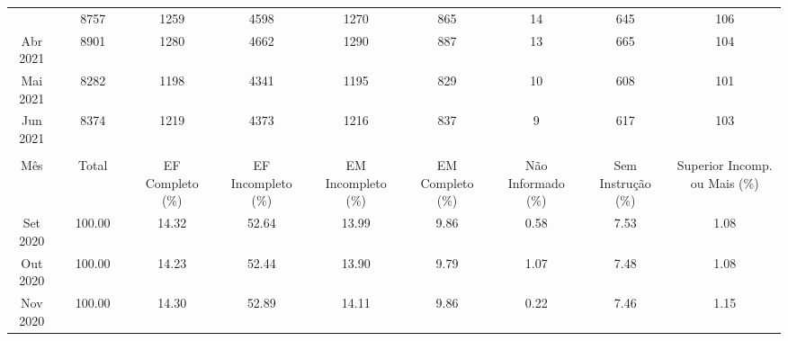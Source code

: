 \documentclass[12pt]{article}
\begin{document}
\begin{landscape}
\begin{table}[htbp]
\begin{adjustbox}{max width=\linewidth}
\begin{tabular}{lllllllllll}
    \rowcolor[rgb]{ .851,  .851,  .851} \multicolumn{1}{c}{Mar 2021} &      & \multicolumn{1}{c}{8757} &      & \multicolumn{1}{c}{1259} & \multicolumn{1}{c}{4598} & \multicolumn{1}{c}{1270} & \multicolumn{1}{c}{865} & \multicolumn{1}{c}{14} & \multicolumn{1}{c}{645} & \multicolumn{1}{c}{106} \\
    \multicolumn{1}{c}{Abr 2021} &      & \multicolumn{1}{c}{8901} &      & \multicolumn{1}{c}{1280} & \multicolumn{1}{c}{4662} & \multicolumn{1}{c}{1290} & \multicolumn{1}{c}{887} & \multicolumn{1}{c}{13} & \multicolumn{1}{c}{665} & \multicolumn{1}{c}{104} \\
    \multicolumn{1}{c}{Mai 2021} &      & \multicolumn{1}{c}{8282} &      & \multicolumn{1}{c}{1198} & \multicolumn{1}{c}{4341} & \multicolumn{1}{c}{1195} & \multicolumn{1}{c}{829} & \multicolumn{1}{c}{10} & \multicolumn{1}{c}{608} & \multicolumn{1}{c}{101} \\
    \multicolumn{1}{c}{Jun 2021} &      & \multicolumn{1}{c}{8374} &      & \multicolumn{1}{c}{1219} & \multicolumn{1}{c}{4373} & \multicolumn{1}{c}{1216} & \multicolumn{1}{c}{837} & \multicolumn{1}{c}{9} & \multicolumn{1}{c}{617} & \multicolumn{1}{c}{103} \\
\cmidrule{1-3}\cmidrule{5-11}    \textcolor[rgb]{ 1,  1,  1}{} & \textcolor[rgb]{ 1,  1,  1}{} &      & \textcolor[rgb]{ 1,  1,  1}{} &      &      &      &      &      &      &  \\
\cmidrule{1-3}\cmidrule{5-11}    \multicolumn{1}{c}{Mês} &      & \multicolumn{1}{c}{Total} &      & \multicolumn{1}{c}{EF Completo (\%)} & \multicolumn{1}{c}{EF Incompleto  (\%)} & \multicolumn{1}{c}{EM Incompleto  (\%)} & \multicolumn{1}{c}{EM Completo  (\%)} & \multicolumn{1}{c}{Não Informado  (\%)} & \multicolumn{1}{c}{Sem Instrução  (\%)} & \multicolumn{1}{c}{Superior Incomp. ou Mais  (\%)} \\
\cmidrule{1-3}\cmidrule{5-11}    \multicolumn{1}{c}{Set 2020} &      & \multicolumn{1}{c}{100.00} &      & \multicolumn{1}{c}{14.32} & \multicolumn{1}{c}{52.64} & \multicolumn{1}{c}{13.99} & \multicolumn{1}{c}{9.86} & \multicolumn{1}{c}{0.58} & \multicolumn{1}{c}{7.53} & \multicolumn{1}{c}{1.08} \\
    \multicolumn{1}{c}{Out 2020} &      & \multicolumn{1}{c}{100.00} &      & \multicolumn{1}{c}{14.23} & \multicolumn{1}{c}{52.44} & \multicolumn{1}{c}{13.90} & \multicolumn{1}{c}{9.79} & \multicolumn{1}{c}{1.07} & \multicolumn{1}{c}{7.48} & \multicolumn{1}{c}{1.08} \\
    \multicolumn{1}{c}{Nov 2020} &      & \multicolumn{1}{c}{100.00} &      & \multicolumn{1}{c}{14.30} & \multicolumn{1}{c}{52.89} & \multicolumn{1}{c}{14.11} & \multicolumn{1}{c}{9.86} & \multicolumn{1}{c}{0.22} & \multicolumn{1}{c}{7.46} & \multicolumn{1}{c}{1.15} \\

\end{tabular}
\end{adjustbox}
\end{table}
\end{landscape}
\end{document}
